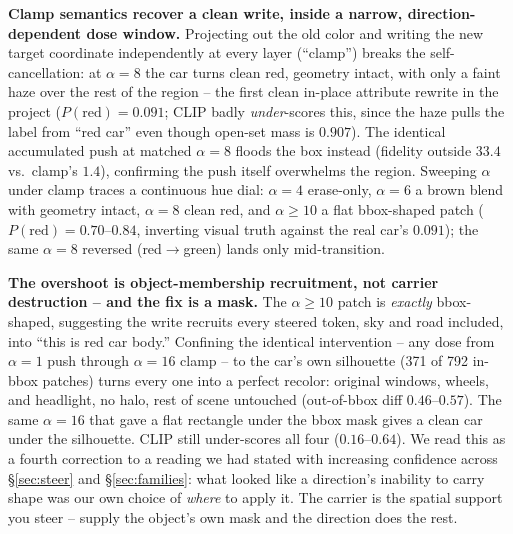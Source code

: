 \documentclass[10pt,twocolumn]{article}
\begin{document}
\textbf{Clamp semantics recover a clean write, inside a narrow,
direction-dependent dose window.} Projecting out the old color and
writing the new target coordinate independently at every layer
(``clamp'') breaks the self-cancellation: at $\alpha{=}8$ the car turns
clean red, geometry intact, with only a faint haze over the rest of the
region -- the first clean in-place attribute rewrite in the project
($P(\text{red})=0.091$; CLIP badly \emph{under}-scores this, since the
haze pulls the label from ``red car'' even though open-set mass is
$0.907$). The identical accumulated push at matched $\alpha{=}8$ floods
the box instead (fidelity outside $33.4$ vs.\ clamp's $1.4$), confirming
the push itself overwhelms the region. Sweeping $\alpha$ under clamp
traces a continuous hue dial: $\alpha{=}4$ erase-only, $\alpha{=}6$ a
brown blend with geometry intact, $\alpha{=}8$ clean red, and
$\alpha{\ge}10$ a flat bbox-shaped patch ($P(\text{red})=0.70$--$0.84$,
inverting visual truth against the real car's $0.091$); the same
$\alpha{=}8$ reversed (red$\to$green) lands only mid-transition.

\textbf{The overshoot is object-membership recruitment, not carrier
destruction -- and the fix is a mask.} The $\alpha{\ge}10$ patch is
\emph{exactly} bbox-shaped, suggesting the write recruits every steered
token, sky and road included, into ``this is red car body.'' Confining
the identical intervention -- any dose from $\alpha{=}1$ push through
$\alpha{=}16$ clamp -- to the car's own silhouette (371 of 792 in-bbox
patches) turns every one into a perfect recolor: original windows,
wheels, and headlight, no halo, rest of scene untouched (out-of-bbox
diff $0.46$--$0.57$). The same $\alpha{=}16$ that gave a flat rectangle
under the bbox mask gives a clean car under the silhouette. CLIP still
under-scores all four ($0.16$--$0.64$). We read this as a fourth
correction to a reading we had stated with increasing confidence across
\S\ref{sec:steer} and \S\ref{sec:families}: what looked like a
direction's inability to carry shape was our own choice of \emph{where}
to apply it. The carrier is the spatial support you steer -- supply the
object's own mask and the direction does the rest.
\end{document}
